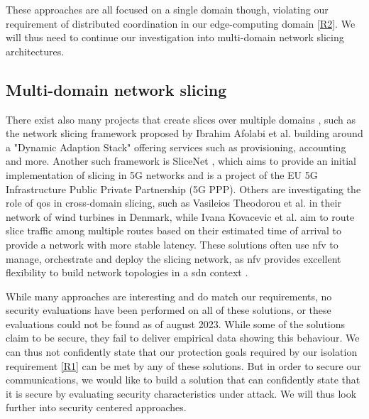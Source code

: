 These approaches are all focused on a single domain though, violating our requirement of distributed coordination in our edge-computing domain \ref{R2}. We will thus need to continue our investigation into multi-domain network slicing architectures.

\subsection{Multi-domain network slicing} There exist also many projects that create slices over multiple domains \cite{MD1,MD2,MD3,MD4,MD5}, such as the network slicing framework proposed by Ibrahim Afolabi et al. \cite{MD1} building around a "Dynamic Adaption Stack" offering services such as provisioning, accounting and more. Another such framework is SliceNet \cite{MD3}, which aims to provide an initial implementation of slicing in 5G networks and is a project of the EU 5G Infrastructure Public Private Partnership (5G PPP). Others are investigating the role of \acrshort{qos} in cross-domain slicing, such as Vasileios Theodorou et al. \cite{MD4} in their network of wind turbines in Denmark, while Ivana Kovacevic et al. \cite{MD5} aim to route slice traffic among multiple routes based on their estimated time of arrival to provide a network with more stable \gls{latency}. These solutions often use \acrshort{nfv} to manage, orchestrate and deploy the slicing network, as \acrshort{nfv} provides excellent flexibility to build network topologies in a \acrshort{sdn} context \cite{5GSDN1,5GSDN2}.

While many approaches are interesting and do match our requirements, no security evaluations have been performed on all of these solutions, or these evaluations could not be found as of august 2023. While some of the solutions claim to be secure, they fail to deliver empirical data showing this behaviour. We can thus not confidently state that our protection goals required by our isolation requirement \ref{R1} can be met by any of these solutions. But in order to secure our communications, we would like to build a solution that can confidently state that it is secure by evaluating security characteristics under attack. We will thus look further into security centered approaches.

